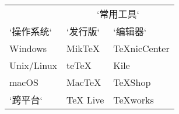 \begin{table}[htbp]
\centering
\begin{tabular}{lll}
  \toprule
  & \multicolumn{2}{c}{`常用工具`} \\
  \cmidrule{2-3}
  `操作系统`    & `发行版`     & `编辑器` \\
  \midrule
  Windows    & MikTeX    & TeXnicCenter \\
  Unix/Linux & teTeX     & Kile \\
  macOS      & MacTeX    & TeXShop \\
  `跨平台`      & TeX Live  & TeXworks \\
  \bottomrule
\end{tabular}
\end{table}
